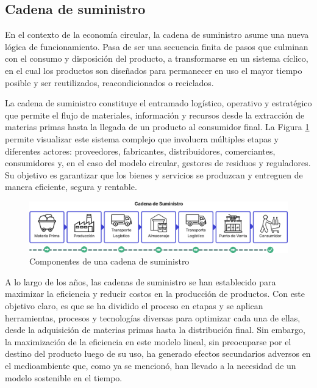 \subsection{Cadena de suministro}
\label{sec:supply-chain}

En el contexto de la economía circular, la cadena de suministro asume una nueva lógica de funcionamiento. Pasa de ser una secuencia finita de pasos que culminan con el consumo y disposición del producto, a transformarse en un sistema cíclico, en el cual los productos son diseñados para permanecer en uso el mayor tiempo posible y ser reutilizados, reacondicionados o reciclados. 

La cadena de suministro constituye el entramado logístico, operativo y estratégico que permite el flujo de materiales, información y recursos desde la extracción de materias primas hasta la llegada de un producto al consumidor final. La Figura \ref{fig:supply-chain} permite visualizar este sistema complejo que involucra múltiples etapas y diferentes actores: proveedores, fabricantes, distribuidores, comerciantes, consumidores y, en el caso del modelo circular, gestores de residuos y reguladores. Su objetivo es garantizar que los bienes y servicios se produzcan y entreguen de manera eficiente, segura y rentable.

\begin{figure}[!tb]
    \centering
    \includegraphics[width=\textwidth]{Figures/supply-chain.png}
    \caption{Componentes de una cadena de suministro}
    \label{fig:supply-chain}
\end{figure}

A lo largo de los años, las cadenas de suministro se han establecido para maximizar la eficiencia y reducir costos en la producción de productos. Con este objetivo claro, es que se ha dividido el proceso en etapas y se aplican herramientas, procesos y tecnologías diversas para optimizar cada una de ellas, desde la adquisición de materias primas hasta la distribución final. Sin embargo, la maximización de la eficiencia en este modelo lineal, sin preocuparse por el destino del producto luego de su uso, ha generado efectos secundarios adversos en el medioambiente que, como ya se mencionó, han llevado a la necesidad de un modelo sostenible en el tiempo.

